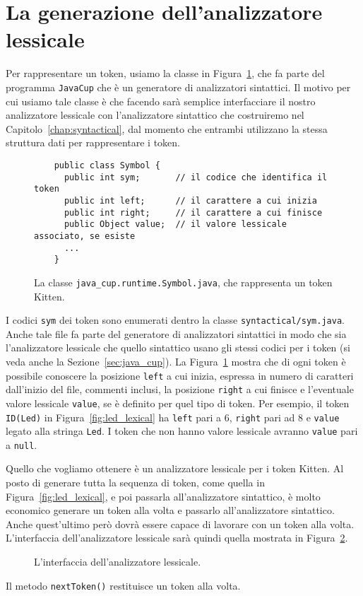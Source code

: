 \section{La generazione dell'analizzatore lessicale}\label{sec:jlex}
%
Per rappresentare un token, usiamo la classe in
Figura~\ref{fig:java_cup.runtime.Symbol}, che fa parte
del programma \texttt{JavaCup} che \`e un generatore di analizzatori
sintattici. Il motivo per cui usiamo tale classe \`e che \cosi
facendo sar\`a \piu semplice interfacciare il nostro analizzatore lessicale
con l'analizzatore sintattico che costruiremo nel
Capitolo~\ref{chap:syntactical}, dal momento
che entrambi utilizzano la stessa struttura dati per rappresentare i token.
%
\begin{figure}
\begin{verbatim}
    public class Symbol {
      public int sym;       // il codice che identifica il token
      public int left;      // il carattere a cui inizia
      public int right;     // il carattere a cui finisce
      public Object value;  // il valore lessicale associato, se esiste
      ...
    }
\end{verbatim}
\caption{La classe \texttt{java\_cup.runtime.Symbol.java}, che rappresenta
un token Kitten.}\label{fig:java_cup.runtime.Symbol}
\end{figure}
%
I codici \texttt{sym} dei token sono enumerati dentro la classe
\texttt{syntactical/sym.java}. Anche tale file fa parte del generatore di
analizzatori sintattici in modo che sia l'analizzatore lessicale
che quello sintattico usano gli stessi codici per i token
(si veda anche la Sezione~\ref{sec:java_cup}).
La Figura~\ref{fig:java_cup.runtime.Symbol} mostra che di ogni token \`e
possibile conoscere la posizione \texttt{left} a cui inizia,
espressa in numero di caratteri dall'inizio del file, commenti inclusi,
la posizione \texttt{right} a cui finisce e l'eventuale
valore lessicale \texttt{value}, se \`e definito per quel tipo di token.
Per esempio, il token \texttt{ID(Led)} in
Figura~\ref{fig:led_lexical} ha \texttt{left} pari a $6$, \texttt{right} pari
ad $8$ e \texttt{value} legato alla stringa \texttt{Led}. I token
che non hanno valore lessicale avranno \texttt{value} pari a \texttt{null}.

Quello che vogliamo ottenere \`e un analizzatore lessicale per i token Kitten.
Al posto di generare tutta la sequenza di token, come quella in
Figura~\ref{fig:led_lexical}, e poi passarla all'analizzatore sintattico,
\`e molto \piu economico generare un token alla volta e passarlo
all'analizzatore sintattico. Anche quest'ultimo per\`o
dovr\`a essere capace di lavorare con un token alla volta.
L'interfaccia dell'analizzatore lessicale sar\`a quindi quella
mostrata in Figura~\ref{fig:lexer}.
%
\begin{figure}
\begin{center}
\end{center}
\caption{L'interfaccia dell'analizzatore lessicale.}\label{fig:lexer}
\end{figure}
%
Il metodo \texttt{nextToken()} restituisce un token alla volta.

